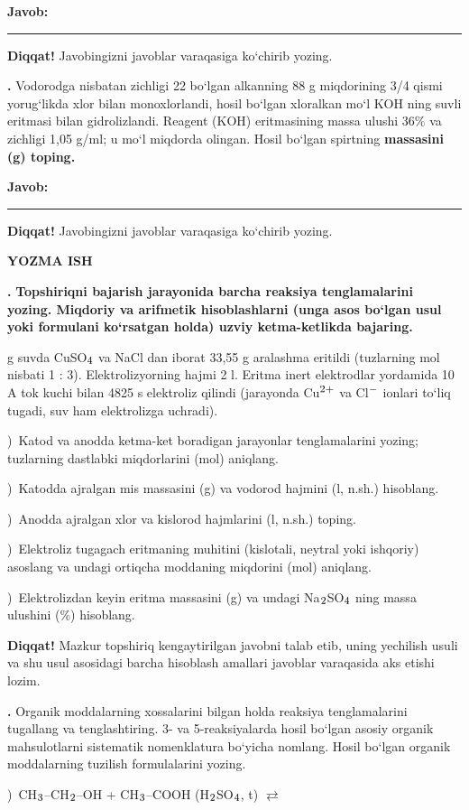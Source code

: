 \documentclass[11pt,a4paper]{article}
\renewcommand{\textsubscript}[1]{\ensuremath{_{\text{\fontsize{8}{8}\selectfont #1}}}}
\renewcommand{\textsuperscript}[1]{\ensuremath{^{\text{\fontsize{8}{8}\selectfont #1}}}}
\newcommand{\qn}[1]{\textbf{\fontsize{11.5}{13}\selectfont #1}}
\newcommand{\qsep}{\par\vspace{13pt}}
\newcommand{\diqqat}[1]{\par\smallskip\noindent\textbf{Diqqat!} #1\par\medskip}
\newcommand{\javob}{\par\nopagebreak[4]\smallskip\noindent\textbf{Javob:} \rule[-2pt]{7.5cm}{0.4pt}\par\smallskip\noindent\textbf{Diqqat!} Javobingizni javoblar varaqasiga ko`chirib yozing.\par\medskip}
\begin{document}
\javob\qsep
\noindent\qn{40.} Vodorodga nisbatan zichligi 22 bo`lgan alkanning 88 g miqdorining 3/4 qismi yorug`likda xlor bilan monoxlorlandi, hosil bo`lgan xloralkan mo`l KOH ning suvli eritmasi bilan gidrolizlandi. Reagent (KOH) eritmasining massa ulushi 36\% va zichligi 1,05 g/ml; u mo`l miqdorda olingan. Hosil bo`lgan spirtning \textbf{massasini (g) toping.}
\javob\qsep
\par\bigskip\begin{center}\textbf{\fontsize{13}{15}\selectfont YOZMA ISH}\end{center}
\noindent\qn{41.} \textbf{Topshiriqni bajarish jarayonida barcha reaksiya tenglamalarini yozing. Miqdoriy va arifmetik hisoblashlarni (unga asos bo`lgan usul yoki formulani ko`rsatgan holda) uzviy ketma-ketlikda bajaring.}\par{} g suvda CuSO\textsubscript{4} va NaCl dan iborat 33,55 g aralashma eritildi (tuzlarning mol nisbati 1 : 3). Elektrolizyorning hajmi 2 l. Eritma inert elektrodlar yordamida 10 A tok kuchi bilan 4825 s elektroliz qilindi (jarayonda Cu\textsuperscript{2+} va Cl\textsuperscript{$-$} ionlari to`liq tugadi, suv ham elektrolizga uchradi).\par
{})\ Katod va anodda ketma-ket boradigan jarayonlar tenglamalarini yozing; tuzlarning dastlabki miqdorlarini (mol) aniqlang.\par
{})\ Katodda ajralgan mis massasini (g) va vodorod hajmini (l, n.sh.) hisoblang.\par
{})\ Anodda ajralgan xlor va kislorod hajmlarini (l, n.sh.) toping.\par
{})\ Elektroliz tugagach eritmaning muhitini (kislotali, neytral yoki ishqoriy) asoslang va undagi ortiqcha moddaning miqdorini (mol) aniqlang.\par
{})\ Elektrolizdan keyin eritma massasini (g) va undagi Na\textsubscript{2}SO\textsubscript{4} ning massa ulushini (\%) hisoblang.\par
\diqqat{Mazkur topshiriq kengaytirilgan javobni talab etib, uning yechilish usuli va shu usul asosidagi barcha hisoblash amallari javoblar varaqasida aks etishi lozim.}\qsep
\noindent\qn{42.} Organik moddalarning xossalarini bilgan holda reaksiya tenglamalarini tugallang va tenglashtiring. 3- va 5-reaksiyalarda hosil bo`lgan asosiy organik mahsulotlarni sistematik nomenklatura bo`yicha nomlang. Hosil bo`lgan organik moddalarning tuzilish formulalarini yozing.\par
{})\ CH\textsubscript{3}--CH\textsubscript{2}--OH + CH\textsubscript{3}--COOH (H\textsubscript{2}SO\textsubscript{4}, t) $\rightleftarrows$\par
\end{document}
